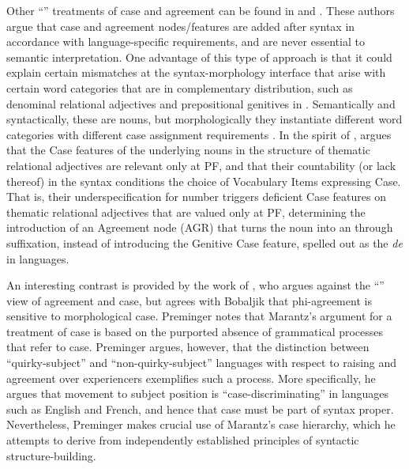 \documentclass[output=paper]{langsci/langscibook}
\begin{document}
Other ``'' treatments of case and agreement can be found in \citet{Embick2006} and \citet{Marchis2015,Marchis2018}. These authors argue that case and agreement nodes\slash features are added after syntax in accordance with language-specific requirements, and are never essential to semantic interpretation. One advantage of this type of approach is that it could explain certain mismatches at the syntax-morphology interface that arise with certain word categories that are in complementary distribution, such as denominal relational adjectives and prepositional genitives in . Semantically and syntactically, these are nouns, but morphologically they instantiate different word categories with different case assignment requirements \citep{Marchis2018}. In the spirit of \citet{Embick2006},  \citet{Marchis2015,Marchis2018} argues that the Case features of the underlying nouns in the structure of thematic relational adjectives are relevant only at PF, and that their countability (or lack thereof) in the syntax conditions the choice of Vocabulary Items expressing Case. That is, their underspecification for number triggers deficient Case features on thematic relational adjectives that are valued only at PF, determining the introduction of an Agreement node (AGR) that turns the noun into an  through suffixation, instead of introducing the Genitive Case feature, spelled out as the  \textit{de} in  languages. 

An interesting contrast is provided by the work of \citet{Preminger2014}, who argues against the ``'' view of agreement and case, but agrees with Bobaljik that phi-agreement is sensitive to morphological case. Preminger notes that Marantz’s argument for a  treatment of case is based on the purported absence of grammatical processes that refer to case. Preminger argues, however, that the distinction between ``quirky-subject'' and ``non-quirky-subject'' languages with respect to raising and agreement over experiencers exemplifies such a process. More specifically, he argues that movement to subject position is ``case-discriminating'' in languages such as English and French, and hence that case must be part of syntax proper. Nevertheless, Preminger makes crucial use of Marantz’s case hierarchy, which he attempts to derive from independently established principles of syntactic structure-building.
\end{document}
